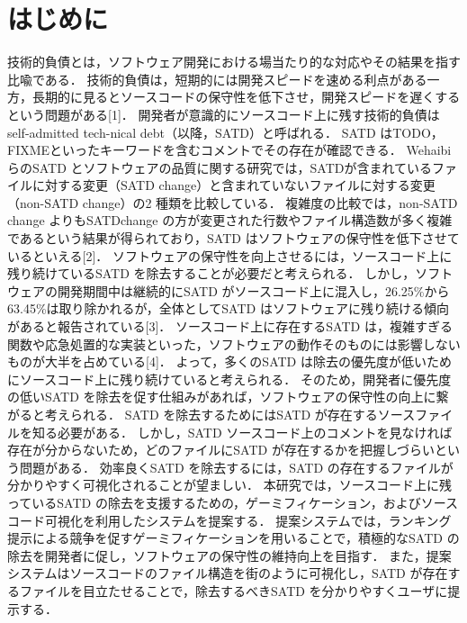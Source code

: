 \chapter{はじめに}
技術的負債とは，ソフトウェア開発における場当たり的な対応やその結果を指す比喩である．
技術的負債は，短期的には開発スピードを速める利点がある一方，長期的に見るとソースコードの保守性を低下させ，開発スピードを遅くするという問題がある[1]．
開発者が意識的にソースコード上に残す技術的負債はself-admitted tech-nical debt（以降，SATD）と呼ばれる．
SATD はTODO，FIXMEといったキーワードを含むコメントでその存在が確認できる．
Wehaibi らのSATD とソフトウェアの品質に関する研究では，SATDが含まれているファイルに対する変更（SATD change）と含まれていないファイルに対する変更（non-SATD change）の2 種類を比較している．
複雑度の比較では，non-SATD change よりもSATDchange の方が変更された行数やファイル構造数が多く複雑であるという結果が得られており，SATD はソフトウェアの保守性を低下させているといえる[2]．
ソフトウェアの保守性を向上させるには，ソースコード上に残り続けているSATD を除去することが必要だと考えられる．
しかし，ソフトウェアの開発期間中は継続的にSATD がソースコード上に混入し，26.25\%から63.45\%は取り除かれるが，全体としてSATD はソフトウェアに残り続ける傾向があると報告されている[3]．
ソースコード上に存在するSATD は，複雑すぎる関数や応急処置的な実装といった，ソフトウェアの動作そのものには影響しないものが大半を占めている[4]．
よって，多くのSATD は除去の優先度が低いためにソースコード上に残り続けていると考えられる．
そのため，開発者に優先度の低いSATD を除去を促す仕組みがあれば，ソフトウェアの保守性の向上に繋がると考えられる．
SATD を除去するためにはSATD が存在するソースファイルを知る必要がある．
しかし，SATD ソースコード上のコメントを見なければ存在が分からないため，どのファイルにSATD が存在するかを把握しづらいという問題がある．
効率良くSATD を除去するには，SATD の存在するファイルが分かりやすく可視化されることが望ましい．
本研究では，ソースコード上に残っているSATD の除去を支援するための，ゲーミフィケーション，およびソースコード可視化を利用したシステムを提案する．
提案システムでは，ランキング提示による競争を促すゲーミフィケーションを用いることで，積極的なSATD の除去を開発者に促し，ソフトウェアの保守性の維持向上を目指す．
また，提案システムはソースコードのファイル構造を街のように可視化し，SATD が存在するファイルを目立たせることで，除去するべきSATD を分かりやすくユーザに提示する．